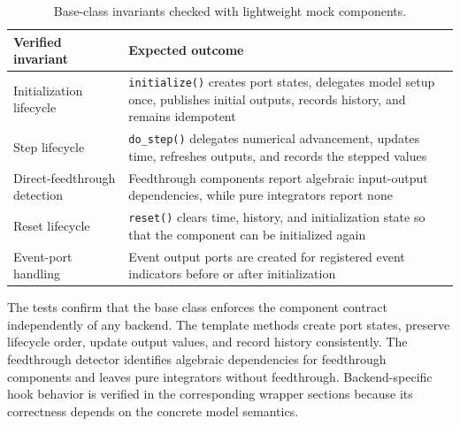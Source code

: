 \begin{table}[htbp]
  \centering
  \small
  \caption[Base-class invariant checks]{Base-class invariants checked with lightweight mock components.}  \label{tab:cosimcomp_verification}
  \begin{tabular}{p{5.3cm} p{9cm}}
    \toprule
    \textbf{Verified invariant} & \textbf{Expected outcome} \\
    \midrule
    Initialization lifecycle
      & \texttt{initialize()} creates port states, delegates model setup once, publishes initial outputs, records history, and remains idempotent \\
    \addlinespace
    Step lifecycle
      & \texttt{do\_step()} delegates numerical advancement, updates time, refreshes outputs, and records the stepped values \\
    \addlinespace
    Direct-feedthrough detection
      & Feedthrough components report algebraic input-output dependencies, while pure integrators report none \\
    \addlinespace
    Reset lifecycle
      & \texttt{reset()} clears time, history, and initialization state so that the component can be initialized again \\
    \addlinespace
    Event-port handling
      & Event output ports are created for registered event indicators before or after initialization \\
    \bottomrule
  \end{tabular}
\end{table}

The tests confirm that the base class enforces the component contract independently of any backend.
The template methods create port states, preserve lifecycle order, update output values, and record history consistently.
The feedthrough detector identifies algebraic dependencies for feedthrough components and leaves pure integrators without feedthrough.
Backend-specific hook behavior is verified in the corresponding wrapper sections because its correctness depends on the concrete model semantics.